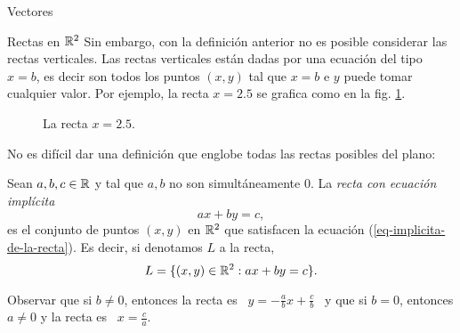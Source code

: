 \begin{chapter}{Vectores}
\begin{section}{Rectas en $\mathbb R^2$}
    Sin embargo, con la definición anterior no es posible considerar las rectas verticales. Las rectas verticales están dadas por una ecuación del tipo $x= b$,  es decir son todos los puntos $(x,y)$  tal que $x=b$ e $y$ puede tomar cualquier valor. Por ejemplo, la recta $x=2.5$ se  grafica  como en la fig. \ref{fig-recta-vertical}.
    \begin{figure}[h]
    	\centering
        \caption{La recta $x=2.5$.}
        \label{fig-recta-vertical}
    \end{figure} 
    
    No es difícil dar una definición que englobe todas las rectas posibles del plano:
    
    \begin{definicion} Sean  $a,b,c \in \mathbb R$ y tal que $a,b$ no son simultáneamente $0$. La \textit{recta con ecuación implícita} 
    \begin{equation}\label{eq-implicita-de-la-recta}
        ax +by =c,
    \end{equation}
    es el conjunto de puntos $(x,y)$ en $\mathbb R^2$ que satisfacen la ecuación (\ref{eq-implicita-de-la-recta}).  Es decir, si denotamos $L$  a la recta,
    \begin{equation*}
        L = \{ (x,y)\in \mathbb R^2: ax +by =c\}.
    \end{equation*}
    \end{definicion}


    Observar  que si $b\ne0$, entonces la recta es \, $y= -\displaystyle\frac{a}{b}x + \displaystyle\frac{c}{b}$ \, y que si $b=0$,  entonces $a\ne 0$ y la recta es \, $x =\displaystyle\frac{c}{a}$.
    

\end{section}
\end{chapter}
